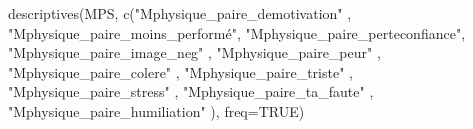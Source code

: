 \documentclass[
]{article}
\newenvironment{Shaded}{\begin{snugshade}}{\end{snugshade}}
\newcommand{\AttributeTok}[1]{\textcolor[rgb]{0.77,0.63,0.00}{#1}}
\newcommand{\ConstantTok}[1]{\textcolor[rgb]{0.00,0.00,0.00}{#1}}
\newcommand{\FunctionTok}[1]{\textcolor[rgb]{0.00,0.00,0.00}{#1}}
\newcommand{\NormalTok}[1]{#1}
\newcommand{\StringTok}[1]{\textcolor[rgb]{0.31,0.60,0.02}{#1}}
\begin{document}
\begin{Shaded}
\begin{Highlighting}[]
\FunctionTok{descriptives}\NormalTok{(MPS, }\FunctionTok{c}\NormalTok{(}\StringTok{"Mphysique\_paire\_demotivation"}\NormalTok{  , }\StringTok{"Mphysique\_paire\_moins\_performé"}\NormalTok{,                      }
                    \StringTok{"Mphysique\_paire\_perteconfiance"}\NormalTok{, }\StringTok{"Mphysique\_paire\_image\_neg"}\NormalTok{     ,}
                    \StringTok{"Mphysique\_paire\_peur"}\NormalTok{          , }\StringTok{"Mphysique\_paire\_colere"}\NormalTok{        ,                      }
                    \StringTok{"Mphysique\_paire\_triste"}\NormalTok{        , }\StringTok{"Mphysique\_paire\_stress"}\NormalTok{        ,   }
                    \StringTok{"Mphysique\_paire\_ta\_faute"}\NormalTok{      , }\StringTok{"Mphysique\_paire\_humiliation"}\NormalTok{    ),}
             \AttributeTok{freq=}\ConstantTok{TRUE}\NormalTok{)}
\end{Highlighting}
\end{Shaded}
\end{document}
